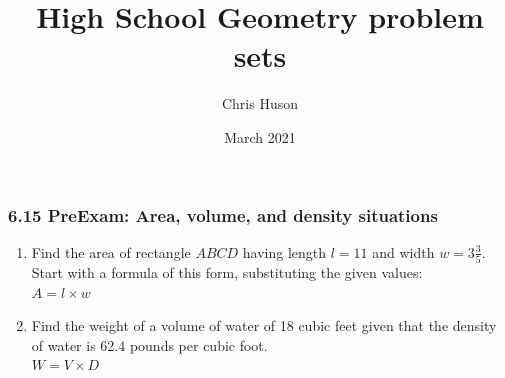 \documentclass[12pt, twoside]{article}
\title{High School Geometry problem sets}
\author{Chris Huson}
\date{March 2021}
\begin{document}
\subsubsection*{6.15 PreExam: Area, volume, and density situations}
\begin{enumerate}

\item Find the area of rectangle $ABCD$ having length $l=11$ and width $w=3 \frac{3}{5}$. Start with a formula of this form, substituting the given values: \\[0.5cm]
$A = l \times w$
  \begin{flushright}
  \end{flushright}

\newpage
\item Find the weight of a volume of water of 18 cubic feet given that the density of water is 62.4 pounds per cubic foot.  \\[0.5cm]
$W=V \times D$


\end{enumerate}
\end{document}
